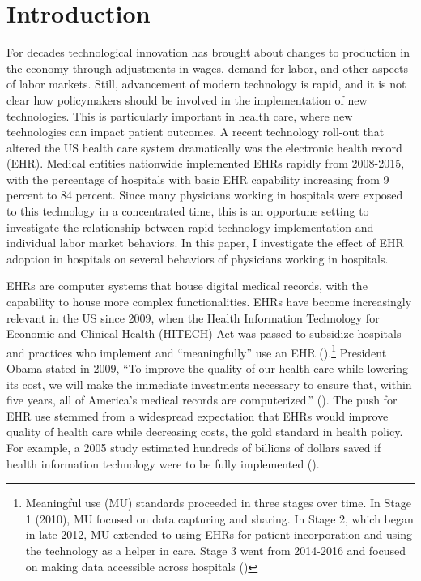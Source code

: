 \documentclass[12pt]{article}
\begin{document}
\section{Introduction}
For decades technological innovation has brought about changes to production in the economy through adjustments in wages, demand for labor, and other aspects of labor markets. Still, advancement of modern technology is rapid, and it is not clear how policymakers should be involved in the implementation of new technologies. This is particularly important in health care, where new technologies can impact patient outcomes. A recent technology roll-out that altered the US health care system dramatically was the electronic health record (EHR). Medical entities nationwide implemented EHRs rapidly from 2008-2015, with the percentage of hospitals with basic EHR capability increasing from 9 percent to 84 percent. Since many physicians working in hospitals were exposed to this technology in a concentrated time, this is an opportune setting to investigate the relationship between rapid technology implementation and individual labor market behaviors. In this paper, I investigate the effect of EHR adoption in hospitals on several behaviors of physicians working in hospitals. 

EHRs are computer systems that house digital medical records, with the capability to house more complex functionalities. EHRs have become increasingly relevant in the US since 2009, when the Health Information Technology for Economic and Clinical Health (HITECH) Act was passed to subsidize hospitals and practices who implement and ``meaningfully'' use an EHR (\cite{hitech}).\footnote{Meaningful use (MU) standards proceeded in three stages over time. In Stage 1 (2010), MU focused on data capturing and sharing. In Stage 2, which began in late 2012, MU extended to using EHRs for patient incorporation and using the technology as a helper in care. Stage 3 went from 2014-2016 and focused on making data accessible across hospitals (\cite{meanuse})} President Obama stated in 2009, “To improve the quality of our health care while lowering its cost, we will make the immediate investments necessary to ensure that, within five years, all of America’s medical records are computerized.” (\cite{presquote}). The push for EHR use stemmed from a widespread expectation that EHRs would improve quality of health care while decreasing costs, the gold standard in health policy. For example, a 2005 study estimated hundreds of billions of dollars saved if health information technology were to be fully implemented (\cite{hillestad2005}).
\end{document}
